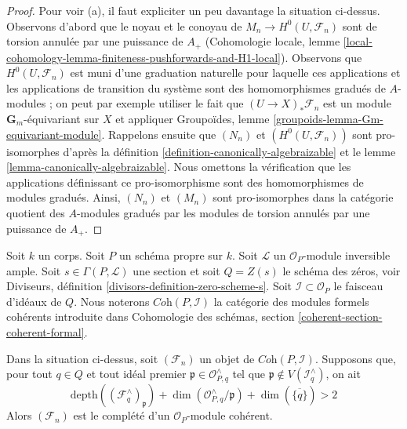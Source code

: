 \begin{proof}
\medskip\noindent
Pour voir (a), il faut expliciter un peu davantage la situation ci-dessus.
Observons d'abord que le noyau et le conoyau de $M_n \to H^0(U, \mathcal{F}_n)$
sont de torsion annulée par une puissance de $A_+$ (Cohomologie locale, lemme
\ref{local-cohomology-lemma-finiteness-pushforwards-and-H1-local}).
Observons que $H^0(U, \mathcal{F}_n)$ est muni d'une graduation naturelle
pour laquelle ces applications et les applications de transition du système sont
des homomorphismes gradués de $A$-modules ; on peut par exemple utiliser le fait que
$(U \to X)_*\mathcal{F}_n$ est un module $\mathbf{G}_m$-équivariant
sur $X$ et appliquer 
Groupoïdes, lemme \ref{groupoids-lemma-Gm-equivariant-module}.
Rappelons ensuite que $(N_n)$ et $(H^0(U, \mathcal{F}_n))$
sont pro-isomorphes d'après la définition \ref{definition-canonically-algebraizable}
et le lemme \ref{lemma-canonically-algebraizable}.
Nous omettons la vérification que les applications définissant ce
pro-isomorphisme sont des homomorphismes de modules gradués.
Ainsi, $(N_n)$ et $(M_n)$ sont pro-isomorphes dans la catégorie quotient des
$A$-modules gradués par les modules de torsion annulés par une puissance de $A_+$.
\end{proof}

\noindent
Soit $k$ un corps. Soit $P$ un schéma propre sur $k$.
Soit $\mathcal{L}$ un $\mathcal{O}_P$-module inversible ample.
Soit $s \in \Gamma(P, \mathcal{L})$ une section et soit
$Q = Z(s)$ le schéma des zéros, voir
Diviseurs, définition \ref{divisors-definition-zero-scheme-s}.
Soit $\mathcal{I} \subset \mathcal{O}_P$ le faisceau d'idéaux de $Q$.
Nous noterons $\textit{Coh}(P, \mathcal{I})$ la catégorie
des modules formels cohérents introduite dans
Cohomologie des schémas, section \ref{coherent-section-coherent-formal}.

\begin{proposition}
\label{proposition-lefschetz-existence}
Dans la situation ci-dessus, soit $(\mathcal{F}_n)$ un objet de
$\textit{Coh}(P, \mathcal{I})$. Supposons que, pour tout $q \in Q$ et tout
idéal premier $\mathfrak p \in \mathcal{O}_{P, q}^\wedge$ tel que
$\mathfrak p \not \in V(\mathcal{I}_q^\wedge)$, on ait
$$
\text{depth}((\mathcal{F}_q^\wedge)_\mathfrak p) +
\dim(\mathcal{O}_{P, q}^\wedge/\mathfrak p) +
\dim(\overline{\{q\}}) > 2
$$
Alors $(\mathcal{F}_n)$ est le complété d'un
$\mathcal{O}_P$-module cohérent.
\end{proposition}

